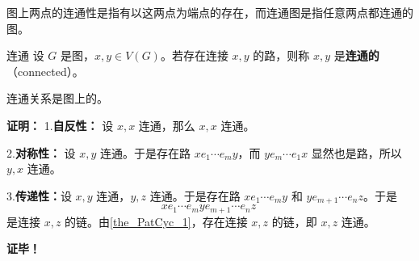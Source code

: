 图上两点的连通性是指有以这两点为端点的存在，而连通图是指任意两点都连通的图。

\begin{definition}{连通}
设 $G$ 是图，$x,y\in V(G)$。若存在连接 $x,y$ 的路，则称 $x,y$ 是\textbf{连通的}（connected）。
\end{definition}

\begin{theorem}{}
连通关系是图上的。
\end{theorem}
\textbf{证明：}
1.\textbf{自反性：} 设 $x,x$ 连通，那么 $x,x$ 连通。

2.\textbf{对称性：} 设 $x,y$ 连通。于是存在路 $xe_1\cdots e_m y$，而 $ye_m\cdots e_1 x$ 显然也是路，所以 $y,x$ 连通。

3.\textbf{传递性：}设 $x,y$ 连通，$y,z$ 连通。于是存在路 $xe_1\cdots e_m y$ 和 $ye_{m+1}\cdots e_{n}z$。于是
\begin{equation}
xe_1\cdots e_m ye_{m+1}\cdots e_{n}z~
\end{equation}
是连接 $x,z$ 的链。由\autoref{the_PatCyc_1}，存在连接 $x,z$ 的链，即 $x,z$ 连通。

\textbf{证毕！}













